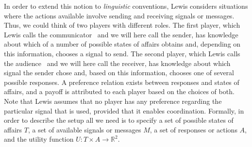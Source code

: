 \documentclass[a4paper]{article}
\begin{document}
In order to extend this notion to \emph{linguistic} conventions, Lewis considers situations where the actions available involve sending and receiving signals or messages.
Thus, we could think of two players with different roles.
The first player, which Lewis calls the communicator~\parencite*[130]{lewis_convention_1969} and we will here call the sender, has knowledge about which of a number of possible states of affairs obtains and, depending on this information, chooses a signal to send.
The second player, which Lewis calls the audience~\parencite*[130]{lewis_convention_1969} and we will here call the receiver, has knowledge about which signal the sender chose and, based on this information, chooses one of several possible responses.
A preference relation exists between responses and states of affairs, and a payoff is attributed to each player based on the choices of both.
Note that Lewis assumes that no player has any preference regarding the particular signal that is used, provided that it enables coordination.
Formally, in order to describe the setup all we need is to specify a set of possible states of affairs $T$, a set of available signals or messages $M$, a set of responses or actions $A$, and the utility function $U : T \times A \rightarrow \mathbb{R}^2$.
\end{document}

